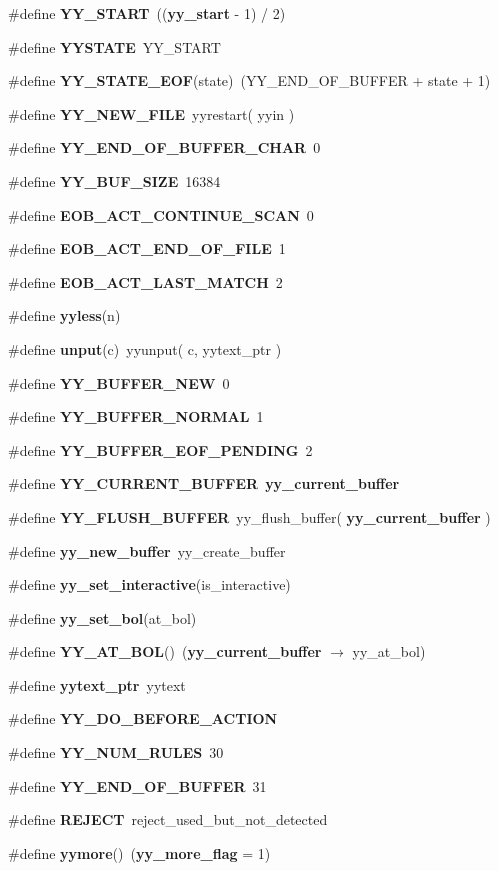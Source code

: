 \begin{CompactItemize}
\item 
\#define {\bf YY\_\-START}\ (({\bf yy\_\-start} - 1) / 2)
\item 
\#define {\bf YYSTATE}\ YY\_\-START
\item 
\#define {\bf YY\_\-STATE\_\-EOF}(state)\ (YY\_\-END\_\-OF\_\-BUFFER + state + 1)
\item 
\#define {\bf YY\_\-NEW\_\-FILE}\ yyrestart( yyin )
\item 
\#define {\bf YY\_\-END\_\-OF\_\-BUFFER\_\-CHAR}\ 0
\item 
\#define {\bf YY\_\-BUF\_\-SIZE}\ 16384
\item 
\#define {\bf EOB\_\-ACT\_\-CONTINUE\_\-SCAN}\ 0
\item 
\#define {\bf EOB\_\-ACT\_\-END\_\-OF\_\-FILE}\ 1
\item 
\#define {\bf EOB\_\-ACT\_\-LAST\_\-MATCH}\ 2
\item 
\#define {\bf yyless}(n)
\item 
\#define {\bf unput}(c)\ yyunput( c, yytext\_\-ptr )
\item 
\#define {\bf YY\_\-BUFFER\_\-NEW}\ 0
\item 
\#define {\bf YY\_\-BUFFER\_\-NORMAL}\ 1
\item 
\#define {\bf YY\_\-BUFFER\_\-EOF\_\-PENDING}\ 2
\item 
\#define {\bf YY\_\-CURRENT\_\-BUFFER}\ {\bf yy\_\-current\_\-buffer}
\item 
\#define {\bf YY\_\-FLUSH\_\-BUFFER}\ yy\_\-flush\_\-buffer( {\bf yy\_\-current\_\-buffer} )
\item 
\#define {\bf yy\_\-new\_\-buffer}\ yy\_\-create\_\-buffer
\item 
\#define {\bf yy\_\-set\_\-interactive}(is\_\-interactive)
\item 
\#define {\bf yy\_\-set\_\-bol}(at\_\-bol)
\item 
\#define {\bf YY\_\-AT\_\-BOL}()\ ({\bf yy\_\-current\_\-buffer} $\rightarrow$ yy\_\-at\_\-bol)
\item 
\#define {\bf yytext\_\-ptr}\ yytext
\item 
\#define {\bf YY\_\-DO\_\-BEFORE\_\-ACTION}
\item 
\#define {\bf YY\_\-NUM\_\-RULES}\ 30
\item 
\#define {\bf YY\_\-END\_\-OF\_\-BUFFER}\ 31
\item 
\#define {\bf REJECT}\ reject\_\-used\_\-but\_\-not\_\-detected
\item 
\#define {\bf yymore}()\ ({\bf yy\_\-more\_\-flag} = 1)
\item 

\end{CompactItemize}
